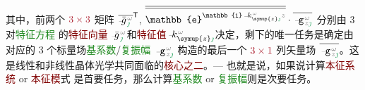 其中，前两个 $\textcolor{Maroon}{3 \times 3}$ 矩阵 $\overline{\Xint{{}^{}_{\mathcolor{gray}{-}}}{10}{\bar{g}}^{\;\!\mathcolor{gray}{\omega}}_{\;\! \textcolor{ForestGreen}{\jmath}}}^\mathsf{T}$, $\overline{\overline{\mathbb{e}^{\mathbb{i} \Xint{\begin{smallmatrix} ~ \\ {}^{}_{\mathcolor{gray}{-}} \\ ~ \end{smallmatrix}}{15}{k}_{\symup{z} \textcolor{ForestGreen}{\jmath}}^{\;\! \mathcolor{gray}{\omega}} \mathcolor{gray}{z}}}} \cdot \overline{\Xint{\begin{smallmatrix} ~ \\ {}^{}_{\mathcolor{gray}{-}} \\ ~ \end{smallmatrix}}{09}{\mathtt{g}}^{\;\!\mathcolor{gray}{\omega}}_{\;\! \mathcolor{gray}{z} \textcolor{ForestGreen}{\jmath}}}$ 分别由 3 对\textcolor{ForestGreen}{特征方程}  的\textcolor{Maroon}{特征向量} $\Xint{{}^{}_{\mathcolor{gray}{-}}}{10}{\bar{g}}^{\;\!\mathcolor{gray}{\omega}}_{\;\! \textcolor{ForestGreen}{\jmath}}$和\textcolor{Maroon}{特征值}$\Xint{\begin{smallmatrix} ~ \\ {}^{}_{\mathcolor{gray}{-}} \\ ~ \end{smallmatrix}}{15}{k}_{\symup{z} \textcolor{ForestGreen}{\jmath}}^{\;\! \mathcolor{gray}{\omega}}$决定，剩下的唯一任务是确定由对应的 3 个标量场\textcolor{ForestGreen}{基系数}/\textcolor{ForestGreen}{复振幅} $\Xint{\begin{smallmatrix} ~ \\ {}^{}_{\mathcolor{gray}{-}} \\ ~ \end{smallmatrix}}{09}{\mathtt{g}}^{\;\!\mathcolor{gray}{\omega}}_{\;\! \mathcolor{gray}{z} \textcolor{ForestGreen}{\jmath}}$ 构造的最后一个 $\textcolor{Maroon}{3 \times 1}$ 列矢量场 $\overline{\Xint{\begin{smallmatrix} ~ \\ {}^{}_{\mathcolor{gray}{-}} \\ ~ \end{smallmatrix}}{09}{\mathtt{g}}^{\;\!\mathcolor{gray}{\omega}}_{\;\! \mathcolor{gray}{z} \textcolor{ForestGreen}{\jmath}}}$。这是线性和非线性晶体光学共同面临的\textcolor{Maroon}{核心之二}。--- 也就是说，如果说计算\textcolor{Maroon}{本征系统} or \textcolor{Maroon}{本征模}式  是首要任务，那么计算\textcolor{ForestGreen}{基系数} or \textcolor{ForestGreen}{复振幅}则是次要任务。

